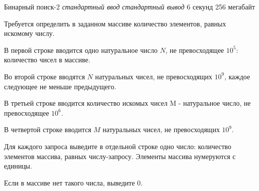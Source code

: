 \begin{problem}%
{Бинарный поиск-2}%
{\textsl{стандартный ввод}}%
{\textsl{стандартный вывод}}%
{6 секунд}%
{256 мегабайт}{}

Требуется определить в заданном массиве количество элементов, равных искомому числу.

\InputFile

В первой строке вводится одно натуральное число $N$, не превосходящее $10^5$: количество чисел в массиве.

Во второй строке вводятся $N$ натуральных чисел, не превосходящих $10^9$, каждое следующее не меньше предыдущего.

В третьей строке вводится количество искомых чисел M - натуральное число, не превосходящее $10^6$.

В четвертой строке вводится $M$ натуральных чисел, не превосходящих $10^9$.
\OutputFile

Для каждого запроса выведите в отдельной строке одно число: количество элементов массива, равных числу-запросу. Элементы массива нумеруются с единицы.

Если в массиве нет такого числа, выведите $0$.

\Examples

\begin{example}
%
\end{example}
\end{problem}
